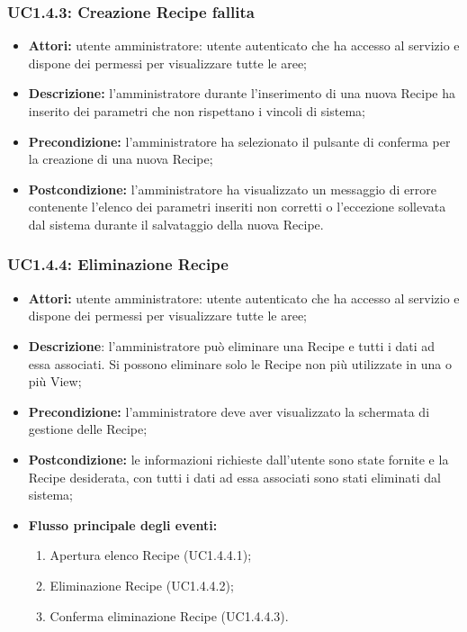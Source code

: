 \subsubsection{UC1.4.3: Creazione Recipe fallita}

\begin{itemize}
  	\item \textbf{Attori:} utente amministratore: utente autenticato che ha accesso al servizio e dispone dei permessi per visualizzare tutte le aree;
    \item \textbf{Descrizione:} l'amministratore durante l'inserimento di una nuova Recipe ha inserito dei parametri che non rispettano i vincoli di sistema;
    \item \textbf{Precondizione:} l'amministratore ha selezionato il pulsante di conferma per la creazione di una nuova Recipe;
    \item \textbf{Postcondizione:} l'amministratore ha visualizzato un messaggio di errore contenente l'elenco dei parametri inseriti non corretti o l'eccezione sollevata dal sistema durante il salvataggio della nuova Recipe.
\end{itemize}

\subsubsection{UC1.4.4: Eliminazione Recipe}

\begin{itemize}
  	\item \textbf{Attori:} utente amministratore: utente autenticato che ha accesso al servizio e dispone dei permessi per visualizzare tutte le aree;
    \item \textbf{Descrizione}: l'amministratore può eliminare una Recipe e tutti i dati ad essa associati.
    Si possono eliminare solo le Recipe non più utilizzate in una o più View;
    \item \textbf{Precondizione:} l'amministratore deve aver visualizzato la schermata di gestione delle Recipe;
    \item \textbf{Postcondizione:} le informazioni richieste dall'utente sono state fornite e la Recipe desiderata, con tutti i dati ad essa associati sono stati eliminati dal sistema;
    \item \textbf{Flusso principale degli eventi:}
    \begin{enumerate}
        \item Apertura elenco Recipe (UC1.4.4.1);
        \item Eliminazione Recipe (UC1.4.4.2);
        \item Conferma eliminazione Recipe (UC1.4.4.3).
    \end{enumerate}
\end{itemize}

